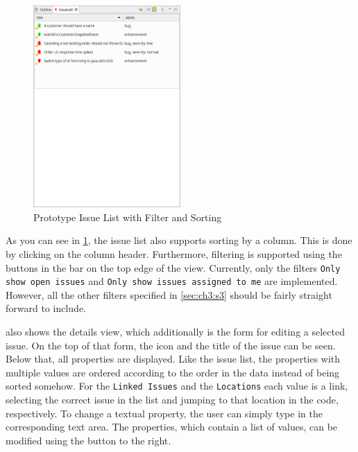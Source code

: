 \begin{figure}[!h]
	\centering
	\includegraphics[width=0.5\textwidth]{graphics/screenshot_gropius_ei_issue_list_filtered_sorted.png}
	\caption{Prototype Issue List with Filter and Sorting}
	\label{fig:c4:screenshot_issue_list_filtered_sorted}
\end{figure}
As you can see in \cref{fig:c4:screenshot_issue_list_filtered_sorted}, the issue list also supports sorting by a column.
This is done by clicking on the column header.
Furthermore, filtering is supported using the buttons in the bar on the top edge of the view.
Currently, only the filters \lstinline|Only show open issues| and \lstinline|Only show issues assigned to me| are implemented. 
However, all the other filters specified in \cref{sec:ch3:s3} should be fairly straight forward to include.

 also shows the details view, which additionally is the form for editing a selected issue.
On the top of that form, the icon and the title of the issue can be seen.
Below that, all properties are displayed.
Like the issue list, the properties with multiple values are ordered according to the order in the data instead of being sorted somehow.
For the \lstinline|Linked Issues| and the \lstinline|Locations| each value is a link, 
selecting the correct issue in the list and jumping to that location in the code, respectively.
To change a textual property, the user can simply type in the corresponding text area.
The properties, which contain a list of values, can be modified using the button to the right.

